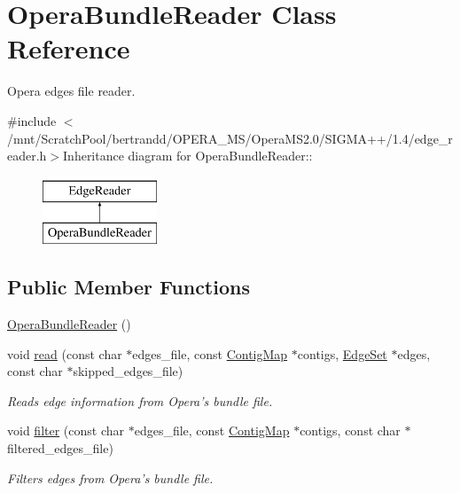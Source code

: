 \hypertarget{classOperaBundleReader}{
\section{OperaBundleReader Class Reference}
\label{classOperaBundleReader}
}


Opera edges file reader.  


{\ttfamily \#include $<$/mnt/ScratchPool/bertrandd/OPERA\_\-MS/OperaMS2.0/SIGMA++/1.4/edge\_\-reader.h$>$}Inheritance diagram for OperaBundleReader::\begin{figure}[H]
\begin{center}
\leavevmode
\includegraphics[height=2cm]{classOperaBundleReader}
\end{center}
\end{figure}
\subsection*{Public Member Functions}
\begin{DoxyCompactItemize}
\item 
\hyperlink{classOperaBundleReader_aaaaa61f53cb7bf436f187d3c6f1e8dc1}{OperaBundleReader} ()
\item 
void \hyperlink{classOperaBundleReader_ad85e56642c7d4b0c65dfbb2dbbf59029}{read} (const char $\ast$edges\_\-file, const \hyperlink{contig_8h_aa2acb8d3b78def617ec4509a1f684c4e}{ContigMap} $\ast$contigs, \hyperlink{edge_8h_ad07b5df6e7cfe15cad88e3b25d48c84f}{EdgeSet} $\ast$edges, const char $\ast$skipped\_\-edges\_\-file)
\begin{DoxyCompactList}\small\item\em Reads edge information from Opera's bundle file. \item\end{DoxyCompactList}\item 
void \hyperlink{classOperaBundleReader_a822e6a9b0ce2d1dd9353a692f328cac6}{filter} (const char $\ast$edges\_\-file, const \hyperlink{contig_8h_aa2acb8d3b78def617ec4509a1f684c4e}{ContigMap} $\ast$contigs, const char $\ast$filtered\_\-edges\_\-file)
\begin{DoxyCompactList}\small\item\em Filters edges from Opera's bundle file. \item\end{DoxyCompactList}\end{DoxyCompactItemize}


